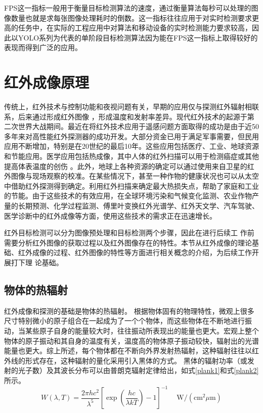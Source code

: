 FPS这一指标一般用于衡量目标检测算法的速度，通过衡量算法每秒可以处理的图像数量也就是求每张图像处理耗时的倒数。这一指标往往应用于对实时检测要求更高的任务中，在实际的工程应用中对算法和移动设备的实时检测能力要求较高，因此以YOLO系列为代表的单阶段目标检测算法因为能在FPS这一指标上取得较好的表现而得到广泛的应用。

\section{红外成像原理}
传统上，红外技术与控制功能和夜视问题有关，早期的应用仅与探测红外辐射相联系，后来通过形成红外图像
，形成温度和发射率差异\cite{rogalski2002infrared}。现代红外技术的起源于第二次世界大战期间。最近在将红外技术应用于遥感问题方面取得的成功是由于近50多年来对高性能红外探测器的成功开发。大部分资金已用于满足军事需要，但民用应用不断增加，特别是在20世纪的最后10年。这些应用包括医疗、工业、地球资源和节能应用。医学应用包括热成像，其中人体的红外扫描可以用于检测癌症或其他提高体表温度的创伤
。此外，地球上各种资源的确定可以通过使用来自卫星的红外图像与现场观察的校准。在某些情况下，甚至一种作物的健康状况也可以从太空中借助红外探测得到确定。利用红外扫描来确定最大热损失点，帮助了家庭和工业的节能。由于这些技术的有效应用，在全球环境污染和气候变化监测、农业作物产量的长期预测、化学过程监测、傅里叶变换红外光谱学、红外天文学、汽车驾驶、医学诊断中的红外成像等方面，使用这些技术的需求正在迅速增长。

红外目标检测可以分为图像预处理和目标检测两个步骤，因此在进行后续工
作前需要分析红外图像的获取过程以及红外图像存在的特性。本节从红外成像的理论基础、红外成像的过程、红外图像的特性等方面进行相关概念的介绍，为后续工作开展打下理
论基础。
\subsection{物体的热辐射}
红外成像和探测的基础是物体的热辐射。
根据物体固有的物理特性，微观上很多尺寸特别微小的原子组合在一起成为了一个个物体，而这些物体在不断地进行振动，当某些原子自身的能量较大时，往往振动所表现出的能量也更大。宏观上整个物体的原子振动和其自身的温度有关，温度高的物体原子振动较快，辐射出的光谱能量也更大。综上所述，每个物体都在不断向外界发射热辐射，这种辐射往往以红外线的形式存在，这种辐射的量化采用引入黑体的方式。
黑体的辐射功率（或发射的光子数）及其波长分布可以由普朗克辐射定律给出，如式\ref{plank1}和式\ref{plank2}所示。
\begin{equation}
    W(\lambda, T)=\frac{2 \pi h c^{2}}{\lambda^{5}}\left[\exp \left(\frac{h c}{\lambda k T}\right)-1\right]^{-1} \quad \mathrm{~W} /\left(\mathrm{cm}^{2} \mu \mathrm{m}\right)
    \label{plank1}
\end{equation}

